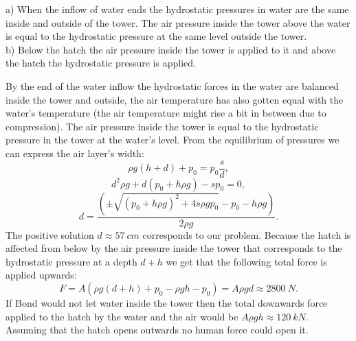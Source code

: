 {\ifEngHint
a) When the inflow of water ends the hydrostatic pressures in water are the same inside and outside of the tower. The air pressure inside the tower above the water is equal to the hydrostatic pressure at the same level outside the tower.\\
b) Below the hatch the air pressure inside the tower is applied to it and above the hatch the hydrostatic pressure is applied.
\fi


\ifEngSolution
By the end of the water inflow the hydrostatic forces in the water are balanced inside the tower and outside, the air temperature has also gotten equal with the water’s temperature (the air temperature might rise a bit in between due to compression). The air pressure inside the tower is equal to the hydrostatic pressure in the tower at the water’s level. From the equilibrium of pressures we can express the air layer’s width:
$$ \rho g (h+d) + p_0 = p_0 \frac{s}{d},$$
$$ d^2 \rho g  + d (p_0 + h \rho g) - s p_0=0, $$
$$ d = \frac{( \pm \sqrt{(p_0 + h \rho g)^2 + 4 s \rho g p_0 } - p_0 - h \rho g)}{2\rho g }.$$
The positive solution $d \approx \SI{57}{cm}$ corresponds to our problem. Because the hatch is affected from below by the air pressure inside the tower that corresponds to the hydrostatic pressure at a depth $d+h$ we get that the following total force is applied upwards:
$$F = A(\rho g (d+h) + p_0 - \rho g h - p_0) = A \rho g d \approx \SI{2800}{N}.  $$
If Bond would not let water inside the tower then the total downwards force applied to the hatch by the water and the air would be $A \rho g h \approx \SI{120}{kN}$. Assuming that the hatch opens outwards no human force could open it.
\fi
}